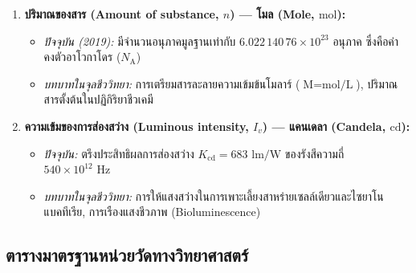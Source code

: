 \begin{enumerate}
    \item \textbf{ปริมาณของสาร (Amount of substance, $n$) --- โมล (Mole, $\text{mol}$):}
    \begin{itemize}
        \item \textit{ปัจจุบัน (2019):} มีจำนวนอนุภาคมูลฐานเท่ากับ $6.022\,140\,76 \times 10^{23}$ อนุภาค ซึ่งคือค่าคงตัวอาโวกาโดร ($N_{\text{A}}$)
        \item \textit{บทบาทในจุลชีววิทยา:} การเตรียมสารละลายความเข้มข้นโมลาร์ ($\text{M} = \text{mol/L}$), ปริมาณสารตั้งต้นในปฏิกิริยาชีวเคมี
    \end{itemize}

    \item \textbf{ความเข้มของการส่องสว่าง (Luminous intensity, $I_v$) --- แคนเดลา (Candela, $\text{cd}$):}
    \begin{itemize}
        \item \textit{ปัจจุบัน:} ตรึงประสิทธิผลการส่องสว่าง $K_{\text{cd}} = 683\text{ lm/W}$ ของรังสีความถี่ $540 \times 10^{12}\text{ Hz}$
        \item \textit{บทบาทในจุลชีววิทยา:} การให้แสงสว่างในการเพาะเลี้ยงสาหร่ายเซลล์เดียวและไซยาโนแบคทีเรีย, การเรืองแสงชีวภาพ (Bioluminescence)
    \end{itemize}
\end{enumerate}

\subsection{ตารางมาตรฐานหน่วยวัดทางวิทยาศาสตร์}


